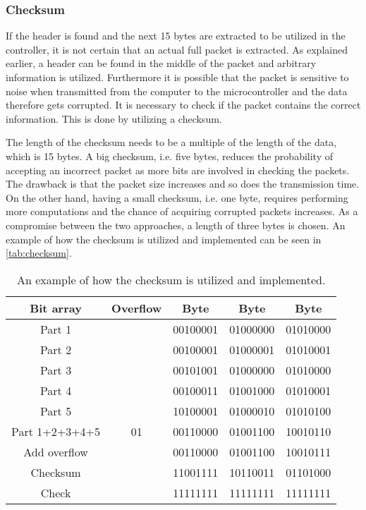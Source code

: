 \subsubsection{Checksum}
If the header is found and the next 15 bytes are extracted to be utilized in the controller, it is not certain that an actual full packet is extracted. As explained earlier, a header can be found in the middle of the packet and arbitrary information is utilized. Furthermore it is possible that the packet is sensitive to noise when transmitted from the computer to the microcontroller and the data therefore gets corrupted. It is necessary to check if the packet contains the correct information. This is done by utilizing a checksum. 

The length of the checksum needs to be a multiple of the length of the data, which is 15 bytes. A big checksum, i.e. five bytes, reduces the probability of accepting an incorrect packet as more bits are involved in checking the packets. The drawback is that the packet size increases and so does the transmission time. On the other hand, having a small checksum, i.e. one byte, requires performing more computations and the chance of acquiring corrupted packets increases. As a compromise between the two approaches, a length of three bytes is chosen. An example of how the checksum is utilized and implemented can be seen in \autoref{tab:checksum}.  

\begin{table}[H]
    \centering
    \begin{tabular}{|c|c|c|c|c|}
        \hline
        Bit array      & Overflow   & Byte 	   & Byte 	  & Byte		 \\ \hline
        Part 1         & 		    & 00100001 & 01000000 & 01010000    \\ \hline
        Part 2         & 		    & 00100001 & 01000001 & 01010001    \\ \hline
        Part 3         & 		    & 00101001 & 01000000 & 01010000    \\ \hline
        Part 4         & 		    & 00100011 & 01001000 & 01010001    \\ \hline
        Part 5         & 		    & 10100001 & 01000010 & 01010100    \\ \hline
        Part 1+2+3+4+5 & 01	        & 00110000 & 01001100 & 10010110 	 \\ \hline
        Add overflow   & 		    & 00110000 & 01001100 & 10010111    \\ \hline
        Checksum       & 		    & 11001111 & 10110011 & 01101000    \\ \hline
        Check          & 		    & 11111111 & 11111111 & 11111111    \\ \hline
    \end{tabular}
    \caption{An example of how the checksum is utilized and implemented.}
    \label{tab:checksum}
\end{table}

